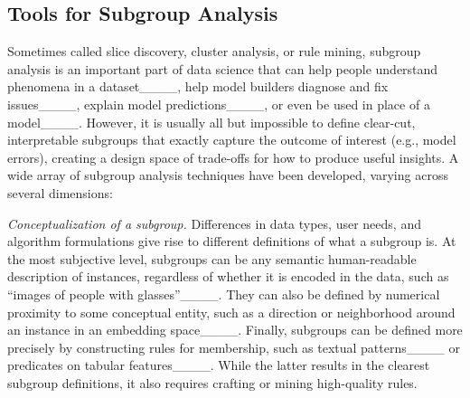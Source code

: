 
\subsection{Tools for Subgroup Analysis}
\label{sec:related-subgroup-analysis}

Sometimes called slice discovery, cluster analysis, or rule mining, subgroup analysis is an important part of data science that can help people understand phenomena in a dataset____, help model builders diagnose and fix issues____, explain model predictions____, or even be used in place of a model____.
However, it is usually all but impossible to define clear-cut, interpretable subgroups that exactly capture the outcome of interest (e.g., model errors), creating a design space of trade-offs for how to produce useful insights.
A wide array of subgroup analysis techniques have been developed, varying across several dimensions:

\textit{Conceptualization of a subgroup.} Differences in data types, user needs, and algorithm formulations give rise to different definitions of what a subgroup is. 
At the most subjective level, subgroups can be any semantic human-readable description of instances, regardless of whether it is encoded in the data, such as ``images of people with glasses''____. 
They can also be defined by numerical proximity to some conceptual entity, such as a direction or neighborhood around an instance in an embedding space____. 
Finally, subgroups can be defined more precisely by constructing rules for membership, such as textual patterns____ or predicates on tabular features____. 
While the latter results in the clearest subgroup definitions, it also requires crafting or mining high-quality rules.

